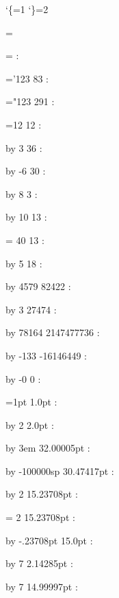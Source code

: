 \catcode`\{=1 %
\catcode`\}=2 %





 {=}

= : \the{}



='123
83 : \the{}

="123
291 : \the{}


=12
12 : \the{}

\multiply {} by 3
36 : \the{}

\advance {} by -6
30 : \the{}

\divide {} by 8
3 : \the{}

\advance {} by 10
13 : \the{}


\countdef\nase = 40
13 : \the\nase

\advance \nase by 5
18 : \the\nase

\multiply\nase by 4579
82422 : \the\nase

\divide\nase by 3
27474 : \the\nase

\multiply\nase by 78164
2147477736 : \the\nase

\divide\nase by -133
-16146449 : \the\nase

\multiply \nase by -0
0 : \the\nase


=1pt
1.0pt : \the{}

\multiply{} by 2
2.0pt : \the{}

\advance{} by 3em
32.00005pt : \the{}

\advance{} by -100000sp
30.47417pt : \the{}

\divide{} by 2
15.23708pt : \the{}


\dimendef\hand = 2
15.23708pt : \the\hand

\advance\hand by -.23708pt
15.0pt : \the\hand

\divide\hand by 7
2.14285pt : \the\hand

\multiply\hand by 7
14.99997pt : \the\hand

